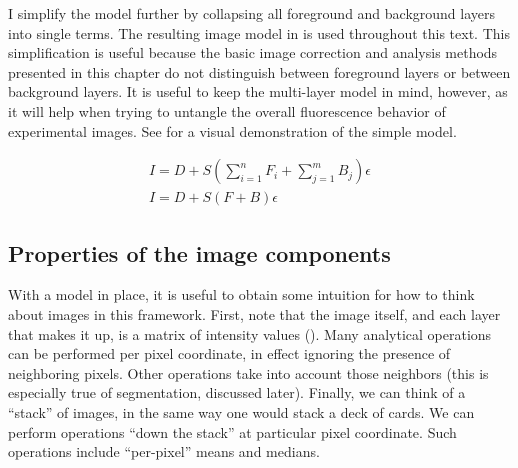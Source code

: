 I simplify the model further by collapsing all
foreground and background layers into
single terms. The resulting image model in 
is used throughout this text.
This simplification is useful because the basic image
correction and analysis methods presented in this chapter do not
distinguish between foreground layers or between background layers.
It is useful to keep the multi-layer model in mind, however, as
it will help when trying to untangle the overall fluorescence behavior
of experimental images.
See  for a visual
demonstration of the simple model. 


\begin{gather}
I = D + S \left( \sum_{i=1}^n F_i + \sum_{j=1}^m B_j \right)\epsilon  \label{eq:imaging:fullModel} \\
I = D + S (F+B)\epsilon  \label{eq:imaging:simpleFullModel}
\end{gather}


\subsection{Properties of the image components}


With a model in place, it is useful to obtain some intuition for how to
think about images in this framework. First, note that the image itself,
and each layer that makes it up, is a matrix of intensity values
(). Many
analytical operations can be performed per pixel coordinate, in effect
ignoring the presence of neighboring pixels.
Other operations take into account
those neighbors (this is especially true of segmentation,
discussed later). Finally, we can think of a ``stack'' of images,
in the same way
one would stack a deck of cards. We can perform operations ``down the
stack'' at particular pixel coordinate.
Such operations include ``per-pixel'' means and medians.


